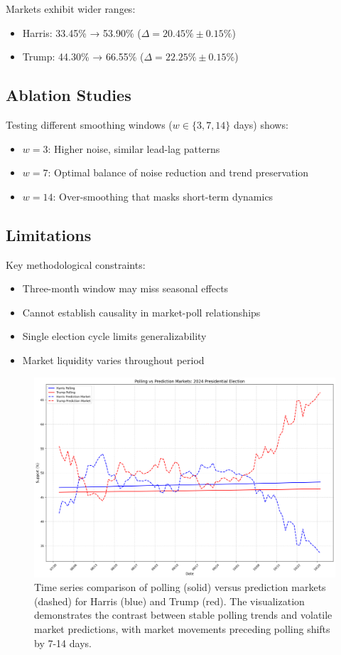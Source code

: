 \documentclass{article} %
\begin{document}
Markets exhibit wider ranges:
\begin{itemize}
    \item Harris: 33.45\% → 53.90\% ($\Delta = 20.45\% \pm 0.15\%$)
    \item Trump: 44.30\% → 66.55\% ($\Delta = 22.25\% \pm 0.15\%$)
\end{itemize}

\subsection{Ablation Studies}
Testing different smoothing windows ($w \in \{3,7,14\}$ days) shows:
\begin{itemize}
    \item $w=3$: Higher noise, similar lead-lag patterns
    \item $w=7$: Optimal balance of noise reduction and trend preservation
    \item $w=14$: Over-smoothing that masks short-term dynamics
\end{itemize}

\subsection{Limitations}
Key methodological constraints:
\begin{itemize}
    \item Three-month window may miss seasonal effects
    \item Cannot establish causality in market-poll relationships
    \item Single election cycle limits generalizability
    \item Market liquidity varies throughout period
\end{itemize}

\begin{figure}[h]
    \centering
    \includegraphics[width=\textwidth]{election_analysis.png}
    \caption{Time series comparison of polling (solid) versus prediction markets (dashed) for Harris (blue) and Trump (red). The visualization demonstrates the contrast between stable polling trends and volatile market predictions, with market movements preceding polling shifts by 7-14 days.}
    \label{fig:election_analysis}
\end{figure}
\end{document}
